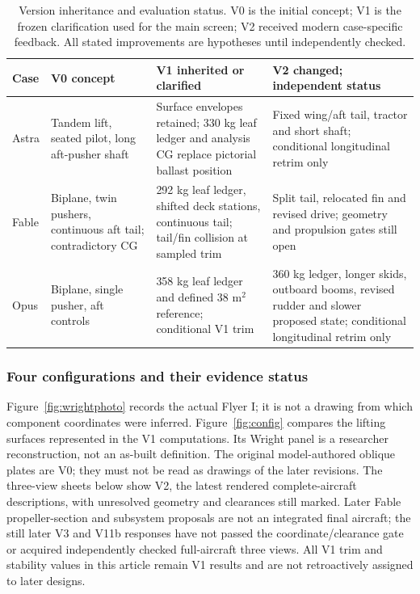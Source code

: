 \documentclass[10pt,letterpaper]{article}
\begin{document}
\begin{table}[H]\centering\footnotesize
\caption{Version inheritance and evaluation status. V0 is the initial concept; V1 is the frozen clarification used for the main screen; V2 received modern case-specific feedback. All stated improvements are hypotheses until independently checked.}\label{tab:stage}
\begin{tabularx}{\linewidth}{lXXX}\toprule
Case & V0 concept & V1 inherited or clarified & V2 changed; independent status\\\midrule
Astra & Tandem lift, seated pilot, long aft-pusher shaft & Surface envelopes retained; 330 kg leaf ledger and analysis CG replace pictorial ballast position & Fixed wing/aft tail, tractor and short shaft; conditional longitudinal retrim only\\
Fable & Biplane, twin pushers, continuous aft tail; contradictory CG & 292 kg leaf ledger, shifted deck stations, continuous tail; tail/fin collision at sampled trim & Split tail, relocated fin and revised drive; geometry and propulsion gates still open\\
Opus & Biplane, single pusher, aft controls & 358 kg leaf ledger and defined 38 m$^2$ reference; conditional V1 trim & 360 kg ledger, longer skids, outboard booms, revised rudder and slower proposed state; conditional longitudinal retrim only\\\bottomrule
\end{tabularx}
\end{table}



\subsubsection{Four configurations and their evidence status}
Figure~\ref{fig:wrightphoto} records the actual Flyer I; it is not a drawing from which component coordinates were inferred. Figure~\ref{fig:config} compares the lifting surfaces represented in the V1 computations. Its Wright panel is a researcher reconstruction, not an as-built definition. The original model-authored oblique plates are V0; they must not be read as drawings of the later revisions. The three-view sheets below show V2, the latest rendered complete-aircraft descriptions, with unresolved geometry and clearances still marked. Later Fable propeller-section and subsystem proposals are not an integrated final aircraft; the still later V3 and V11b responses have not passed the coordinate/clearance gate or acquired independently checked full-aircraft three views. All V1 trim and stability values in this article remain V1 results and are not retroactively assigned to later designs.
\end{document}
